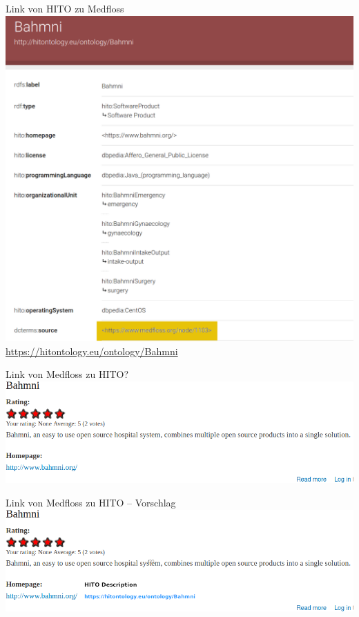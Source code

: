 \documentclass[aspectratio=1610,12pt]{beamer}
\begin{document}
\begin{frame}{Link von HITO zu Medfloss}
  \vspace{-0.2cm}
  \centering
  \includegraphics[height=.75\textheight]{img/hito-bahmni.png}
    \footnotesize{\url{https://hitontology.eu/ontology/Bahmni}}
\end{frame}

\begin{frame}{Link von Medfloss zu HITO?}
  \includegraphics[width=\textwidth]{img/medfloss-bahmni.png}
\end{frame}

\begin{frame}{Link von Medfloss zu HITO -- Vorschlag}
  \includegraphics[width=\textwidth]{img/medfloss-bahmni-link.png}
\end{frame}
\end{document}
